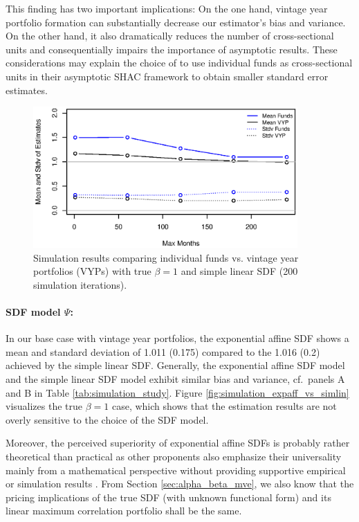 \documentclass[12pt]{article}
\begin{document}
This finding has two important implications:
On the one hand, vintage year portfolio formation can substantially decrease our estimator's bias and variance.
On the other hand, it also dramatically reduces the number of cross-sectional units and consequentially impairs the importance of asymptotic results.
These considerations may explain the choice of \cite{KN16} to use individual funds as cross-sectional units in their asymptotic SHAC framework to obtain smaller standard error estimates.

\begin{figure}
	\centering
	\includegraphics[width=0.9\textwidth]{Figures/spatial/Simulationfundsvsvyps}
	\caption{Simulation results comparing individual funds vs. vintage year portfolios (VYPs) with true $\beta=1$ and simple linear SDF (200 simulation iterations).}
	\label{fig:simulation_funds_vs_vyps}
\end{figure}


\paragraph{SDF model $\Psi$:}

In our base case with vintage year portfolios, the exponential affine SDF shows a mean and standard deviation of 1.011 (0.175) compared to the 1.016 (0.2) achieved by the simple linear SDF.
Generally, the exponential affine SDF model and the simple linear SDF model exhibit similar bias and variance, cf.\ panels A and B in Table \ref{tab:simulation_study}.
Figure \ref{fig:simulation_expaff_vs_simlin} visualizes the true $\beta=1$ case, which shows that the estimation results are not overly sensitive to the choice of the SDF model.

Moreover, the perceived superiority of exponential affine SDFs is probably rather theoretical than practical as other proponents also emphasize their universality mainly from a mathematical perspective without providing supportive empirical or simulation results \citep{GM07,BMP08}.
From Section \ref{sec:alpha_beta_mve}, we also know that the pricing implications of the true SDF (with unknown functional form) and its linear maximum correlation portfolio shall be the same.
\end{document}

